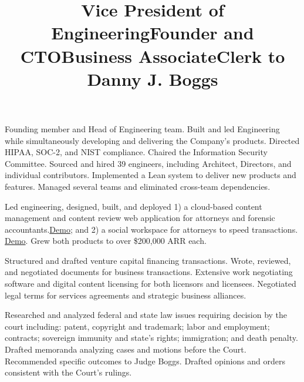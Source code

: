 \documentclass[margin]{res}
\begin{document}
\begin{resume}
\title{\textbf{Vice President of Engineering}}
\begin{position}
\hspace*{.25cm}Founding member and Head of Engineering team. Built and led Engineering while simultaneously developing and delivering the Company's products. Directed HIPAA, SOC-2, and NIST compliance. Chaired the Information Security Committee. Sourced and hired 39 engineers, including Architect, Directors, and individual contributors. Implemented a Lean system to deliver new products and features. Managed several teams and eliminated cross-team dependencies.
\end{position}

\title{\textbf{Founder and CTO}}
\begin{position}
\hspace*{.25cm}Led engineering, designed, built, and deployed 1) a cloud-based content management and content review web application for attorneys and forensic accountants.\href{https://hero.net/public/demo.html}{Demo}; and 2) a social workspace for attorneys to speed transactions. \href{https://hero.net/public/tour.html}{Demo}. Grew both products to over \$200,000 ARR each.
\end{position}

\title{\textbf{Business Associate}}
\begin{position}
\hspace*{.25cm}Structured and drafted venture capital financing transactions. Wrote, reviewed, and negotiated documents for business transactions. Extensive work negotiating software and digital content licensing for both licensors and licensees. Negotiated legal terms for services agreements and strategic business alliances.
\end{position}

\title{\textbf{Clerk to Danny J. Boggs}}
\begin{position}
\hspace*{.25cm}Researched and analyzed federal and state law issues requiring decision by the court including: patent, copyright and trademark; labor and employment; contracts; sovereign immunity and state’s rights; immigration; and death penalty. Drafted memoranda analyzing cases and motions before the Court.  Recommended specific outcomes to Judge Boggs. Drafted opinions and orders consistent with the Court’s rulings.
\end{position}



\end{resume}
\end{document}
